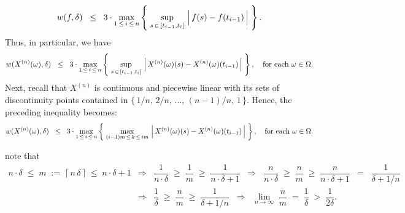 \begin{equation*}
	w(f,\delta) \;\; \leq \;\; 3 \cdot
	\max_{1\,\leq\,i\,\leq\,n}\left\{\;
	\sup_{s\,\in\,[t_{i-1},t_{i}]}\,\left\vert\,\overset{{\color{white}.}}{f}(s) - f(t_{i-1})\,\right\vert
	\;\right\}.
\end{equation*}
Thus, in particular, we have
\begin{equation*}
	w(X^{(n)}(\omega),\delta) \;\; \leq \;\; 3 \cdot
	\max_{1\,\leq\,i\,\leq\,n}\left\{\;
	\sup_{s\,\in\,[t_{i-1},t_{i}]}\,\left\vert\,X^{(n)}(\omega)(s) \overset{{\color{white}.}}{-} X^{(n)}(\omega)(t_{i-1})\,\right\vert
	\;\right\},
	\quad
	\textnormal{for each $\omega \in \Omega$.}
\end{equation*}
Next, recall that $X^{(n)}$ is continuous and piecewise linear with its sets of discontinuity points
contained in $\{\,1/n,\, 2/n,\, \ldots,\, (n-1)/n,\, 1\,\}$.
Hence, the preceding inequality becomes:
\begin{equation*}
	w(X^{(n)}(\omega),\delta) \;\; \leq \;\; 3 \cdot
	\max_{1\,\leq\,i\,\leq\,n}\left\{\;
	\max_{(i-1)m\,\leq\,k\,\leq\,im}\,\left\vert\,X^{(n)}(\omega)(s) \overset{{\color{white}.}}{-} X^{(n)}(\omega)(t_{i-1})\,\right\vert
	\;\right\},
	\quad
	\textnormal{for each $\omega \in \Omega$.}
\end{equation*}

note that
\begin{eqnarray*}
n\cdot\delta \;\leq\; m \;:=\; \lceil\,n\,\delta\,\rceil \;\leq\; n\cdot\delta + 1
&\Longrightarrow&
	\dfrac{1}{n\cdot\delta} \;\geq\; \dfrac{1}{m} \;\geq\; \dfrac{1}{n\cdot\delta + 1}
\;\;\Longrightarrow\;\;
	\dfrac{n}{n\cdot\delta} \;\geq\; \dfrac{n}{m} \;\geq\; \dfrac{n}{n\cdot\delta + 1}
	\;\;=\;\; \dfrac{1}{\delta + 1/n}
\\
&\Longrightarrow&
	\dfrac{1}{\delta} \;\geq\; \dfrac{n}{m} \;\geq\; \dfrac{1}{\delta + 1/n}
\;\;\Longrightarrow\;\;
	\underset{n\rightarrow\infty}{\lim}\;\dfrac{n}{m} \;=\; \dfrac{1}{\delta} \;>\; \dfrac{1}{2\delta}.
\end{eqnarray*}
%


